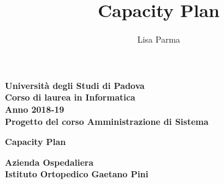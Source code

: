 \documentclass[a4paper, oneside, openany,12pt]{article}
\title{\textbf{Capacity Plan}}
\author{Lisa Parma}
\begin{document}
	
\begin{titlepage}
	\begin{center}
	
		\textbf{Università degli Studi di Padova \\ Corso di laurea in Informatica \\ Anno 2018-19 \\}
		\textbf{Progetto del corso Amministrazione di Sistema}
		\vspace{1cm}
		\begin{center}
			\begin{Huge}
				\textbf{Capacity Plan} \\
			\end{Huge}
			\begin{Large}
				\textbf{Azienda Ospedaliera} \\
				\textbf{Istituto Ortopedico Gaetano Pini} \\
			\end{Large}
		
	\end{center}
	\end{center}
\end{titlepage}

\tableofcontents

\end{document}
